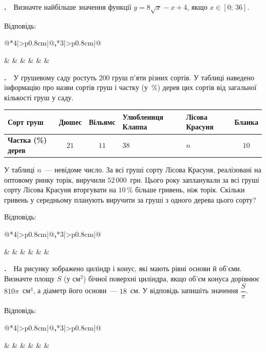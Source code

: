 \documentclass[12pt]{article}
\makeatletter
\newcommand{\nmtAnswerBox}{%
\par\vspace{0.2cm}\noindent
Відповідь:\ \ 
\begin{tabular}{@{}*{4}{|>{\centering\arraybackslash}p{0.8cm}}|@{\hspace{0.1cm}\textbf{,}\hspace{0.1cm}}*{3}{|>{\centering\arraybackslash}p{0.8cm}}|@{}}
\hline
\rule[-0.2cm]{0pt}{0.7cm} & & & & & & \\
\hline
\end{tabular}
\par\vspace{0.3cm}}
\newcounter{zad}
\newcommand{\zadtask}[1]{\stepcounter{zad}\par\vspace{0.3cm}\noindent\textbf{\thezad.}\ \ #1\par\vspace{0.2cm}}
\newcommand{\zadnum}{\stepcounter{zad}\noindent\textbf{\thezad.}\ \ }
\makeatother
\begin{document}
\zadtask{Визначте найбільше значення функції $y = 8\sqrt{x} - x + 4$, якщо $x \in [0;\, 36]$.}
\nmtAnswerBox

\zadtask{У грушевому саду ростуть $200$ груш п'яти різних сортів. У таблиці наведено інформацію про назви сортів груш і частку (у~\%) дерев цих сортів від загальної кількості груш у саду.
\vspace{0.2cm}

\noindent\begin{center}
\renewcommand{\arraystretch}{1.3}
\begin{tabular}{|>{\centering\arraybackslash}m{2.2cm}|c|c|>{\centering\arraybackslash}m{2cm}|>{\centering\arraybackslash}m{2cm}|c|}
\hline
\textbf{Сорт груш} & Дюшес & Вільямс & Улюблениця Клаппа & Лісова Красуня & Бланка \\
\hline
\textbf{Частка (\%) дерев} & $21$ & $11$ & $38$ & $n$ & $10$ \\
\hline
\end{tabular}
\end{center}
\vspace{0.2cm}

У таблиці $n$~--- невідоме число. За всі груші сорту Лісова Красуня, реалізовані на оптовому ринку торік, виручили $52\,000$~грн. Цього року запланували за всі груші сорту Лісова Красуня вторгувати на $10\,\%$ більше гривень, ніж торік. Скільки гривень у середньому планують виручити за груші з одного дерева цього сорту?}
\nmtAnswerBox

\noindent
\begin{minipage}[c]{0.56\textwidth}
\zadnum На рисунку зображено циліндр і конус, які мають рівні основи й об'єми. Визначте площу $S$ (у см$^2$) бічної поверхні циліндра, якщо об'єм конуса дорівнює $810\pi$~см$^3$, а діаметр його основи~--- $18$~см. У відповідь запишіть значення $\dfrac{S}{\pi}$.
\end{minipage}%
\hfill
\begin{minipage}[c]{0.42\textwidth}
\centering
{}
\end{minipage}
\par\vspace{0.2cm}
\nmtAnswerBox
\end{document}

